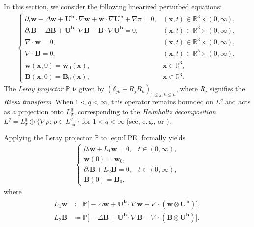\documentclass[10pt]{amsart}
\theoremstyle{plain}
\theoremstyle{definition}
\theoremstyle{remark}
\numberwithin{equation}{section}
\newcommand{\loc}{\mathrm{loc}}
\newcommand{\p}{\partial}
\newcommand{\pt}{\partial_t}
\newcommand{\bx}{\boldsymbol{x}}
\newcommand{\bb}{{\boldsymbol{b}}}
\newcommand{\bU}{{\boldsymbol{U}}}
\newcommand{\bw}{{\boldsymbol{w}}}
\newcommand{\bB}{{\boldsymbol{B}}}
\begin{document}
In this section, we consider the following linearized perturbed equations:
\begin{align}\label{eqn:LPE}
\begin{cases}
\pt \bw - \Delta\bw +  \bU^\bb\cdot \nabla\bw+\bw\cdot \nabla \bU^\bb+\nabla \pi = 0, 
&(\bx,t)\in \mathbb{R}^3\times(0,\infty),\\
\pt \bB - \Delta \bB + \bU^\bb \cdot \nabla \bB-\bB\cdot \nabla \bU^\bb =0,
& (\bx,t)\in \mathbb{R}^3\times(0,\infty),\\
\nabla \cdot \bw =0, 
& (\bx,t)\in \mathbb{R}^3\times(0,\infty),\\
\nabla \cdot \bB=0, & (\bx,t)\in \mathbb{R}^3\times(0,\infty),\\
\bw(\bx,0)=\bw_0(\bx), & \bx \in \mathbb{R}^3,\\
\bB(\bx,0)=\bB_0(\bx), & \bx \in \mathbb{R}^3.
\end{cases}
\end{align}
The \emph{Leray projector} $\mathbb P$ is given by $(\delta_{jk}+R_jR_k)_{1\le j,k\le n}$, where $R_j$ signifies the \emph{Riesz transform}. When $1<q<\infty$, this operator remains bounded on $L^q$ and acts as a projection onto $L^q_{\sigma}$, corresponding to the \textit{Helmholtz decomposition} $L^q = L^q_{\sigma} \oplus \{\nabla p : \ p \in L^q_{\loc}\}$ for $1<q<\infty$ (see, e.\,g., \cite[Chapter III]{Galdi11} or \cite[Section 1]{Tsai2018}). 


Applying the Leray projector $\mathbb P$ to \cref{eqn:LPE} formally yields
\begin{align}\label{eqn:LPE2}
\begin{cases}
\p_t \bw + L_1 \bw =0, & t \in   (0,\infty), \\ \bw(0)=\bw_0,\\
\p_t \bB + L_2 \bB =0, & t \in (0,\infty), \\ \bB(0)=\bB_0,
\end{cases}   
\end{align}
where 
\begin{align}\label{eqn:linearoperator}
\begin{aligned}
L_1 \bw&\coloneqq \mathbb P \bigl[- \Delta\bw +  \bU^\bb\cdot \nabla\bw + \nabla\cdot  (\bw \otimes \bU^\bb)\bigr],\\
L_2 \bB&\coloneqq \mathbb P \bigl[- \Delta \bB + \bU^\bb \cdot \nabla \bB-\nabla\cdot (\bB \otimes \bU^\bb )\bigr].
\end{aligned}
\end{align}
\end{document}
